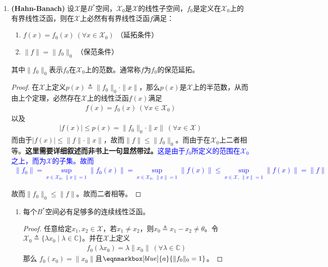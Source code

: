 \begin{enumerate}[leftmargin=2cm, label=\arabic*]
    \item \textbf{(Hahn-Banach)} 设$\mathscr{X}$是$B^*$空间，$\mathscr{X}_0$是$\mathscr{X}$的线性子空间，$f_0$是定义在$\mathscr{X}_0$上的有界线性泛函，则在$\mathscr{X}$上必然有有界线性泛函$f$满足：
    \begin{enumerate}[leftmargin=1cm, label=(\arabic*)]
        \item $f(x) = f_0(x)\ (\forall x\in\mathscr{X}_0)$ （延拓条件）
        \item $\|f\| = \|f_0\|_0$ （保范条件）
    \end{enumerate}
    其中$\|f_0\|_0$表示$f_0$在$\mathscr{X}_0$上的范数。通常称$f$为$f_0$的保范延拓。
    \begin{proof}
        在$\mathscr{X}$上定义$p(x)\triangleq \|f_0\|_0 \cdot \|x\|$，那么$p(x)$是$\mathscr{X}$上的半范数，从而由上个定理，必然存在$\mathscr{X}$上的线性泛函$f(x)$满足
        \begin{align*}
            f(x) = f_0(x) \ (\forall x\in\mathscr{X}_0)
        \end{align*}
        以及
        \begin{align*}
            |f(x)| \leqslant p(x) = \|f_0\|_0 \cdot \|x\| \ (\forall x\in\mathscr{X})
        \end{align*}
        而由于$|f(x)|\leqslant \|f\|\cdot \|x\|$，故而$\|f\|\leqslant \|f_0\|_0$。而由于在$\mathscr{X}_0$上二者相等。\textbf{这里需要详细叙述而非书上一句显然带过。}\textcolor{blue}{这是由于$f_0$所定义的范围在$\mathscr{X}_0$之上，而为$\mathscr{X}$的子集。故而}
        \textcolor{blue}{\begin{align*}
            \|f_0\| = \sup\limits_{x\in\mathscr{X}_0,\ \|x\| = 1} \|f_0(x)\| = \sup\limits_{x\in\mathscr{X}_0,\ \|x\| = 1} \|f(x)\| \leqslant \sup\limits_{x\in\mathscr{X},\ \|x\|=1} \|f(x)\| = \|f\|
        \end{align*}}
        
        故而$\|f_0\|_0\leqslant \|f\|$。故而二者相等。
    \end{proof}

    \begin{enumerate}[leftmargin=1cm, label=(\arabic*)]
        \item 每个$B^*$空间必有足够多的连续线性泛函。
        \begin{proof}
            任意给定$x_1,x_2\in\mathscr{X}$，若$x_1\neq x_2$，则$x_0\triangleq x_1-x_2\neq \theta$。令$\mathscr{X}_0\triangleq \{\lambda x_0\mid \lambda\in\mathbb{C}\}$。并在$\mathscr{X}$上定义
            \begin{align*}
                f_0(\lambda x_0) = \lambda\|x_0\| \ (\forall\lambda\in\mathbb{C})
            \end{align*}
            那么 $f_0(x_0) = \|x_0\|$且$\eqnmarkbox[blue]{a}{\|f_0\|_0= 1}$。


\end{proof}
\end{enumerate}
\end{enumerate}
